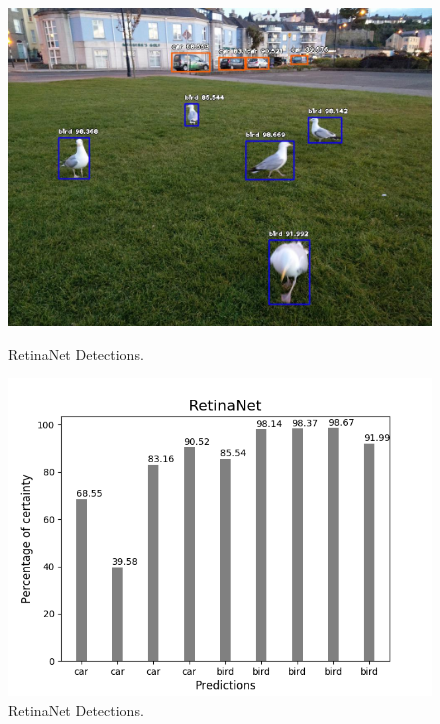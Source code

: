     \begin{figure}[htb]
        \centering
        \begin{minipage}[b]{0.44\textwidth}
          \includegraphics[width=\textwidth]{Sections/4InitialWork/4_images_obj_run3/retinaNet.jpg}
          \caption{RetinaNet Detections.}
        \end{minipage}
        \hfill
        \begin{minipage}[b]{0.50\textwidth}
          \includegraphics[width=\textwidth]{Sections/4InitialWork/4_images_obj_run3/retinaNet_graph.png}
          \caption{RetinaNet Detections.}
        \end{minipage}
      \end{figure}
    
